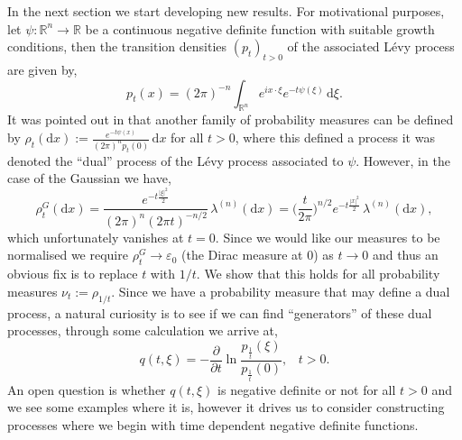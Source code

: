 \documentclass[a4paper, 12pt]{report}
\theoremstyle{cor}
\theoremstyle{remark}
\theoremstyle{definition}
\begin{document}
In the next section we start developing new results.  For motivational purposes, let $\psi : \mathbb{R}^n \to \mathbb{R}$ be a continuous negative definite function with suitable growth conditions, then the transition densities $(p_t)_{t > 0}$ of the associated L\'evy process are given by,
$$
p_t(x) = (2\pi)^{-n}\int_{\mathbb{R}^n}e^{ix\cdot\xi}e^{-t\psi(\xi)}\,\mathrm{d}\xi.
$$
It was pointed out in \cite{Paper} that another family of probability measures can be defined by $\rho_t(\mathrm{d}x) := \frac{e^{-t\psi(x)}}{(2\pi)^np_t(0)}\,\mathrm{d}x$ for all $t > 0$, where this defined a process it was denoted the ``dual'' process of the L\'evy process associated to $\psi$.  However, in the case of the Gaussian we have,
$$
\rho_t^G(\mathrm{d}x) = \frac{e^{-t\frac{|\xi|^2}{2}}}{(2\pi)^n(2\pi t)^{-n/2}}\,\lambda^{(n)}(\mathrm{d}x) = \bigg(\frac{t}{2\pi}\bigg)^{n/2}e^{-t\frac{|x|^2}{2}}\,\lambda^{(n)}(\mathrm{d}x),
$$
which unfortunately vanishes at $t = 0$.  Since we would like our measures to be normalised we require $\rho_t^G \to \varepsilon_0$ (the Dirac measure at $0$) as $t \to 0$ and thus an obvious fix is to replace $t$ with $1/t$.  We show that this holds for all probability measures $\nu_t := \rho_{1/t}$.  Since we have a probability measure that may define a dual process, a natural curiosity is to see if we can find ``generators'' of these dual processes, through some calculation we arrive at,
$$
q(t, \xi) = -\frac{\partial}{\partial t}\ln\frac{p_\frac{1}{t}(\xi)}{p_\frac{1}{t}(0)}, \,\,\,\,\, t > 0.
$$
An open question is whether $q(t, \xi)$ is negative definite or not for all $t > 0$ and we see some examples where it is, however it drives us to consider constructing processes where we begin with time dependent negative definite functions.
\end{document}
